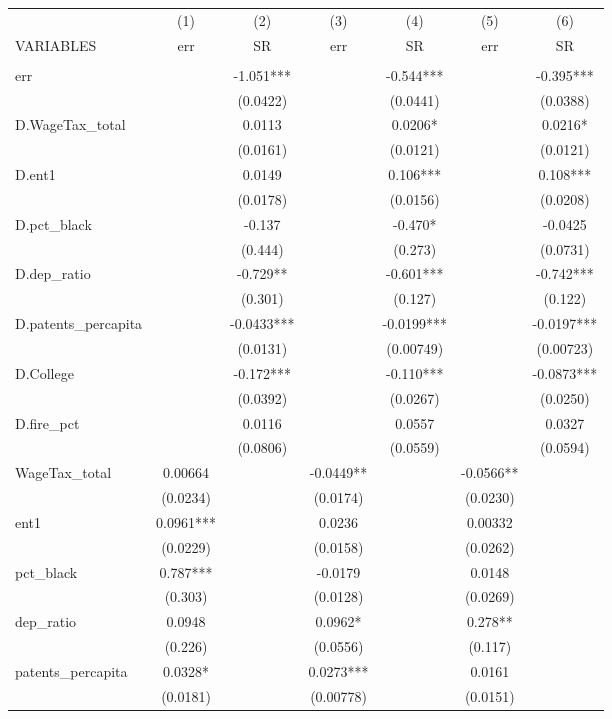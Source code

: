 \begin{tabular}{lcccccc} \hline
 & (1) & (2) & (3) & (4) & (5) & (6) \\
VARIABLES & err & SR & err & SR & err & SR \\ \hline
 &  &  &  &  &  &  \\
err &  & -1.051*** &  & -0.544*** &  & -0.395*** \\
 &  & (0.0422) &  & (0.0441) &  & (0.0388) \\
D.WageTax\_total &  & 0.0113 &  & 0.0206* &  & 0.0216* \\
 &  & (0.0161) &  & (0.0121) &  & (0.0121) \\
D.ent1 &  & 0.0149 &  & 0.106*** &  & 0.108*** \\
 &  & (0.0178) &  & (0.0156) &  & (0.0208) \\
D.pct\_black &  & -0.137 &  & -0.470* &  & -0.0425 \\
 &  & (0.444) &  & (0.273) &  & (0.0731) \\
D.dep\_ratio &  & -0.729** &  & -0.601*** &  & -0.742*** \\
 &  & (0.301) &  & (0.127) &  & (0.122) \\
D.patents\_percapita &  & -0.0433*** &  & -0.0199*** &  & -0.0197*** \\
 &  & (0.0131) &  & (0.00749) &  & (0.00723) \\
D.College &  & -0.172*** &  & -0.110*** &  & -0.0873*** \\
 &  & (0.0392) &  & (0.0267) &  & (0.0250) \\
D.fire\_pct &  & 0.0116 &  & 0.0557 &  & 0.0327 \\
 &  & (0.0806) &  & (0.0559) &  & (0.0594) \\
WageTax\_total & 0.00664 &  & -0.0449** &  & -0.0566** &  \\
 & (0.0234) &  & (0.0174) &  & (0.0230) &  \\
ent1 & 0.0961*** &  & 0.0236 &  & 0.00332 &  \\
 & (0.0229) &  & (0.0158) &  & (0.0262) &  \\
pct\_black & 0.787*** &  & -0.0179 &  & 0.0148 &  \\
 & (0.303) &  & (0.0128) &  & (0.0269) &  \\
dep\_ratio & 0.0948 &  & 0.0962* &  & 0.278** &  \\
 & (0.226) &  & (0.0556) &  & (0.117) &  \\
patents\_percapita & 0.0328* &  & 0.0273*** &  & 0.0161 &  \\
 & (0.0181) &  & (0.00778) &  & (0.0151) &  \\

\end{tabular}
